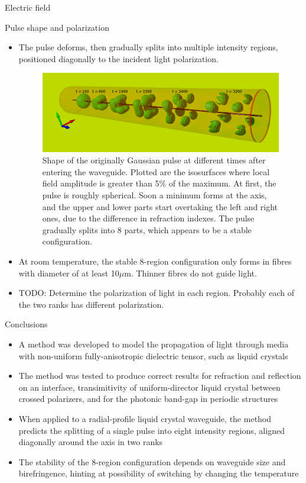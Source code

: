 \documentclass[8pt]{beamer}
\newlength{\wideitemsep}
\let\olditem\item
\renewcommand{\item}{\setlength{\itemsep}{\wideitemsep}\olditem}
\newcommand{\blockpadding}{
  \rule[-0.6ex]{0pt}{2.5ex}
}
\begin{document}
\begin{columns}[t]
\begin{column}{0.596\textwidth}
\begin{block}{\blockpadding Electric field}
\end{block}
\begin{block}{\blockpadding Pulse shape and polarization}
\begin{itemize}
\item The pulse deforms, then gradually splits into multiple intensity regions, positioned diagonally to the incident light polarization. 
\vspace{.3ex}
 \begin{figure}[h]
  \centering
  \includegraphics[width=.825\textwidth]{./intensity_gauss_t}
  \caption{Shape of the originally Gaussian pulse at different times after entering the waveguide. Plotted are the isosurfaces where local field amplitude is greater than 5\% of the maximum. At first, the pulse is roughly spherical. Soon a minimum forms at the axis, and the upper and lower parts start overtaking the left and right ones, due to the difference in refraction indexes. The pulse gradually splits into 8 parts, which appears to be a stable configuration. }
 \end{figure}

 \item At room temperature, the stable 8-region configuration only forms in fibres with diameter of at least 10$\mu$m. Thinner fibres do not guide light. 
 \item TODO: Determine the polarization of light in each region. Probably each of the two ranks has different polarization. 
\end{itemize}


\end{block}

\begin{block}{\blockpadding Conclusions}
 \begin{itemize}
  \item A method was developed to model the propagation of light through media with non-uniform fully-anisotropic dielectric tensor, such as liquid crystals
  \item The method was tested to produce correct results for refraction and reflection on an interface, transimitivity of uniform-director liquid crystal between crossed polarizers, and for the photonic band-gap in periodic structures
  \item When applied to a radial-profile liquid crystal waveguide, the method predicts the splitting of a single pulse into eight intensity regions, aligned diagonally around the axis in two ranks
  \item The stability of the 8-region configuration depends on waveguide size and birefringence, hinting at possibility of switching by changing the temperature
 \end{itemize}


\end{block}
\end{column}
\end{columns}
\end{document}
